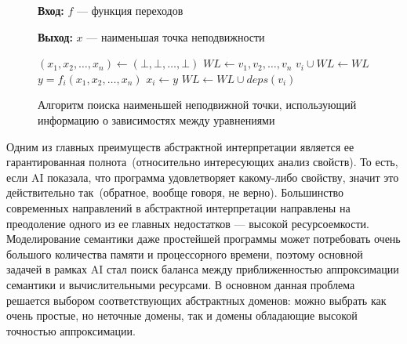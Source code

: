 \begin{figure}[h!]
\textbf{Вход:} $f$ --- функция переходов

\textbf{Выход:} $x$ --- наименьшая точка неподвижности

\begin{algorithmic}
\State $(x_1, x_2, \ldots, x_n) \gets (\bot, \bot, \ldots, \bot)$ 
\State $WL \gets {v_1, v_2, \ldots, v_n}$ 
	\State ${v_i} \cup WL \gets WL$
	\State $y = f_i(x_1, x_2, \ldots, x_n)$ 
		\State $x_i \gets y$
		\State $WL \gets WL \cup deps(v_i)$
	\EndIf 
\EndWhile
\end{algorithmic}

\caption{Алгоритм поиска наименьшей неподвижной точки, использующий 
информацию о зависимостях между уравнениями}
\label{image:worklistLFP}
\end{figure}

Одним из главных преимуществ абстрактной интерпретации является ее 
гарантированная полнота~(относительно интересующих анализ свойств). То есть,
если AI показала, что программа удовлетворяет какому-либо свойству, значит это
действительно так~(обратное, вообще говоря, не верно). Большинство современных
направлений в абстрактной интерпретации направлены на преодоление одного из ее
главных недостатков --- высокой ресурсоемкости. Моделирование семантики даже 
простейшей программы может потребовать очень большого количества памяти и 
процессорного времени, поэтому основной задачей в рамках AI стал поиск баланса 
между приближенностью аппроксимации семантики и вычислительными ресурсами.
В основном данная проблема решается выбором соответствующих абстрактных доменов:
можно выбрать как очень простые, но неточные домены, так и домены обладающие 
высокой точностью аппроксимации.

